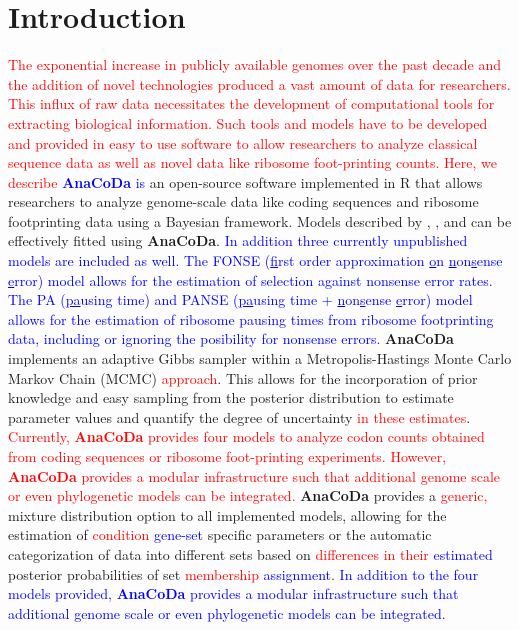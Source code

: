 \documentclass{bioinfo}
\newcommand{\package}{\textbf{AnaCoDa }} %
\newcommand{\packagee}{\textbf{AnaCoDa}}
\begin{document}
\section*{Introduction}

\textcolor{red}
{
The exponential increase in publicly available genomes over the past decade and the addition of novel technologies produced a vast amount of data for researchers.  
This influx of raw data necessitates the development of computational tools for extracting biological information. 
Such tools and models have to be developed and provided in easy to use software to allow researchers to analyze classical sequence data as well as novel data like ribosome foot-printing counts.
Here, we describe
} %
\textcolor{blue}{\package is}  an open-source software implemented in R \citep{rcore} that allows researchers to analyze genome-scale data like coding sequences and ribosome footprinting data using a Bayesian framework. 
Models described by \citet{gilchrist2015}, \citet{wallace2013}, and \citet{shah2011} can be effectively fitted using \packagee.
\textcolor{blue} 
{
In addition three currently unpublished models are included as well. The FONSE (\underline{f}irst order approximation \underline{o}n \underline{n}on\underline{s}ense \underline{e}rror) model allows for the estimation of selection against nonsense error rates.
The PA (\underline{pa}using time) and PANSE (\underline{pa}using time + \underline{n}on\underline{s}ense \underline{e}rror) model allows for the estimation of ribosome pausing times from ribosome footprinting data, including or ignoring the posibility for nonsense errors.
} %
\package implements an adaptive Gibbs sampler within a Metropolis-Hastings Monte Carlo Markov Chain (MCMC) \textcolor{red}{approach}. 
This allows for the incorporation of prior knowledge and easy sampling from the posterior distribution to estimate parameter values and quantify the degree of uncertainty \textcolor{red}{in these estimates}.
\textcolor{red}
{
Currently, \package provides four models to analyze codon counts obtained from coding sequences or ribosome foot-printing experiments. 
However, \package provides a modular infrastructure such that additional genome scale or even phylogenetic models can be integrated.
} 
\package provides a \textcolor{red}{generic,} mixture distribution option to all implemented models, allowing for the estimation of \textcolor{red}{condition} \textcolor{blue}{gene-set} specific parameters or the automatic categorization of data into different sets based on \textcolor{red}{differences in their} \textcolor{blue}{estimated} posterior probabilities of set \textcolor{red}{membership} \textcolor{blue}{assignment}.
\textcolor{blue}
{
In addition to the four models provided, \package provides a modular infrastructure such that additional genome scale or even phylogenetic models can be integrated.
}
\end{document}
